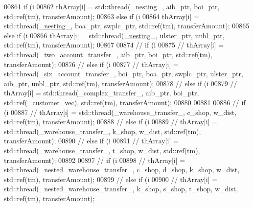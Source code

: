\begin{DoxyCode}
00861       \textcolor{keywordflow}{if} (i %
00862           thArray[i] = std::thread(\hyperlink{main_8cpp_a5675cb594d74aa1bf5e80233370ffd81}{\_nesting\_}, aib\_ptr, boi\_ptr, std::ref(tm), transferAmount);
00863       \textcolor{keywordflow}{else} \textcolor{keywordflow}{if} (i %
00864           thArray[i] = std::thread(\hyperlink{main_8cpp_a5675cb594d74aa1bf5e80233370ffd81}{\_nesting\_}, boa\_ptr, swplc\_ptr, std::ref(tm), transferAmount);
00865       \textcolor{keywordflow}{else} \textcolor{keywordflow}{if} (i %
00866           thArray[i] = std::thread(\hyperlink{main_8cpp_a5675cb594d74aa1bf5e80233370ffd81}{\_nesting\_}, ulster\_ptr, unbl\_ptr, std::ref(tm), transferAmount);
00867 
00874         \textcolor{comment}{//    if (i %
00875         \textcolor{comment}{//        thArray[i] = std::thread(\_two\_account\_transfer\_, aib\_ptr, boi\_ptr, std::ref(tm),
       transferAmount);}
00876         \textcolor{comment}{//    else if (i %
00877         \textcolor{comment}{//        thArray[i] = std::thread(\_six\_account\_transfer\_, boi\_ptr, boa\_ptr, swplc\_ptr, ulster\_ptr,
       aib\_ptr, unbl\_ptr, std::ref(tm), transferAmount);}
00878         \textcolor{comment}{//    else if (i %
00879         \textcolor{comment}{//        thArray[i] = std::thread(\_complex\_transfer\_, aib\_ptr, boi\_ptr, std::ref(\_customer\_vec),
       std::ref(tm), transferAmount);}
00880 
00881 
00886         \textcolor{comment}{//        if (i %
00887         \textcolor{comment}{//            thArray[i] = std::thread(\_warehouse\_transfer\_, c\_shop, w\_dist, std::ref(tm),
       transferAmount);}
00888         \textcolor{comment}{//        else if (i %
00889         \textcolor{comment}{//            thArray[i] = std::thread(\_warehouse\_transfer\_, k\_shop, w\_dist, std::ref(tm),
       transferAmount);}
00890         \textcolor{comment}{//        else if (i %
00891         \textcolor{comment}{//            thArray[i] = std::thread(\_warehouse\_transfer\_, t\_shop, w\_dist, std::ref(tm),
       transferAmount);}
00892 
00897         \textcolor{comment}{//        if (i %
00898         \textcolor{comment}{//            thArray[i] = std::thread(\_nested\_warehouse\_transfer\_, c\_shop, d\_shop, k\_shop, w\_dist,
       std::ref(tm), transferAmount);}
00899         \textcolor{comment}{//        else if (i %
00900         \textcolor{comment}{//            thArray[i] = std::thread(\_nested\_warehouse\_transfer\_, k\_shop, s\_shop, t\_shop, w\_dist,
       std::ref(tm), transferAmount);}
}}}}}}}}
\end{DoxyCode}
